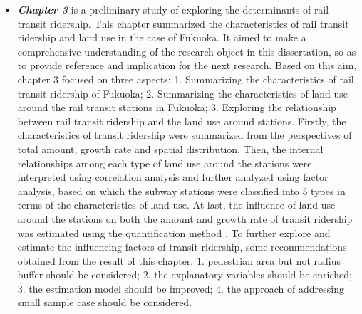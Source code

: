 \begin{itemize}
	\item \emph{\textbf{Chapter 3}} is a preliminary study of exploring the determinants of rail transit ridership. This chapter	summarized the characteristics of rail transit ridership and land use in the case of Fukuoka. It aimed to make a comprehensive understanding of the research object in this dissertation, so as to provide reference and implication for the next research. Based on this aim, chapter 3 focused on three aspects: 1. Summarizing the characteristics of rail transit ridership of Fukuoka; 2. Summarizing the characteristics of land use around the rail transit stations in Fukuoka; 3. Exploring the relationship between rail transit ridership and the land use around stations. Firstly, the characteristics of transit ridership were summarized from the perspectives of total amount, growth rate and spatial distribution. Then, the internal relationships among each type of land use around the stations were interpreted using correlation analysis and further analyzed using factor analysis, based on which the subway stations were classified into 5 types in terms of the characteristics of land use. At last, the influence of land use around the stations on both the amount and growth rate of transit ridership was estimated using the quantification method \uppercase\expandafter{}. To further explore and estimate the influencing factors of transit ridership, some recommendations obtained from the result of this chapter: 1. pedestrian area but not radius buffer should be considered; 2. the explanatory variables should be enriched; 3. the estimation model should be improved; 4. the approach of addressing small sample case should be considered.
	

\end{itemize}
